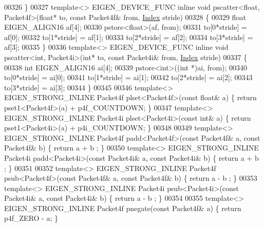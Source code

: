 \begin{DoxyCode}
{00326 \}
00327 \textcolor{keyword}{template}<> EIGEN\_DEVICE\_FUNC \textcolor{keyword}{inline} \textcolor{keywordtype}{void} pscatter<float, Packet4f>(\textcolor{keywordtype}{float}* to, \textcolor{keyword}{const} Packet4f& from, 
      \hyperlink{namespace_eigen_a62e77e0933482dafde8fe197d9a2cfde}{Index} stride)
00328 \{
00329   \textcolor{keywordtype}{float} EIGEN\_ALIGN16 af[4];
00330   pstore<float>(af, from);
00331   to[0*stride] = af[0];
00332   to[1*stride] = af[1];
00333   to[2*stride] = af[2];
00334   to[3*stride] = af[3];
00335 \}
00336 \textcolor{keyword}{template}<> EIGEN\_DEVICE\_FUNC \textcolor{keyword}{inline} \textcolor{keywordtype}{void} pscatter<int, Packet4i>(\textcolor{keywordtype}{int}* to, \textcolor{keyword}{const} Packet4i& from, 
      \hyperlink{namespace_eigen_a62e77e0933482dafde8fe197d9a2cfde}{Index} stride)
00337 \{
00338   \textcolor{keywordtype}{int} EIGEN\_ALIGN16 ai[4];
00339   pstore<int>((\textcolor{keywordtype}{int} *)ai, from);
00340   to[0*stride] = ai[0];
00341   to[1*stride] = ai[1];
00342   to[2*stride] = ai[2];
00343   to[3*stride] = ai[3];
00344 \}
00345 
00346 \textcolor{keyword}{template}<> EIGEN\_STRONG\_INLINE Packet4f plset<Packet4f>(\textcolor{keyword}{const} \textcolor{keywordtype}{float}& a) \{ \textcolor{keywordflow}{return} pset1<Packet4f>(a) + 
      p4f\_COUNTDOWN; \}
00347 \textcolor{keyword}{template}<> EIGEN\_STRONG\_INLINE Packet4i plset<Packet4i>(\textcolor{keyword}{const} \textcolor{keywordtype}{int}& a)   \{ \textcolor{keywordflow}{return} pset1<Packet4i>(a) + 
      p4i\_COUNTDOWN; \}
00348 
00349 \textcolor{keyword}{template}<> EIGEN\_STRONG\_INLINE Packet4f padd<Packet4f>(\textcolor{keyword}{const} Packet4f& a, \textcolor{keyword}{const} Packet4f& b) \{ \textcolor{keywordflow}{return} a + b
      ; \}
00350 \textcolor{keyword}{template}<> EIGEN\_STRONG\_INLINE Packet4i padd<Packet4i>(\textcolor{keyword}{const} Packet4i& a, \textcolor{keyword}{const} Packet4i& b) \{ \textcolor{keywordflow}{return} a + b
      ; \}
00351 
00352 \textcolor{keyword}{template}<> EIGEN\_STRONG\_INLINE Packet4f psub<Packet4f>(\textcolor{keyword}{const} Packet4f& a, \textcolor{keyword}{const} Packet4f& b) \{ \textcolor{keywordflow}{return} a - b
      ; \}
00353 \textcolor{keyword}{template}<> EIGEN\_STRONG\_INLINE Packet4i psub<Packet4i>(\textcolor{keyword}{const} Packet4i& a, \textcolor{keyword}{const} Packet4i& b) \{ \textcolor{keywordflow}{return} a - b
      ; \}
00354 
00355 \textcolor{keyword}{template}<> EIGEN\_STRONG\_INLINE Packet4f pnegate(\textcolor{keyword}{const} Packet4f& a) \{ \textcolor{keywordflow}{return} p4f\_ZERO - a; \}
}
\end{DoxyCode}
